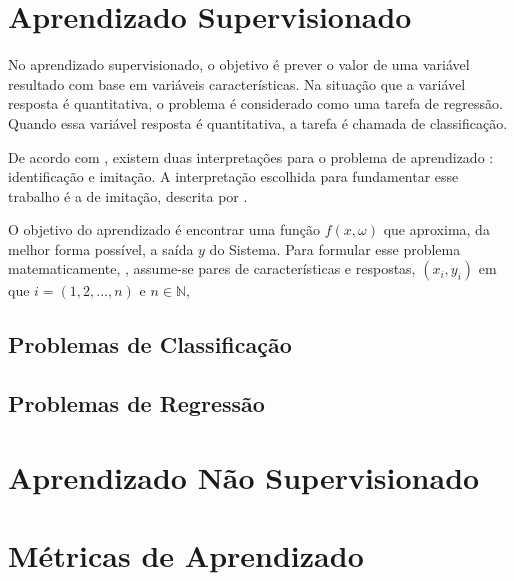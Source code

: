 \section{Aprendizado Supervisionado}

No aprendizado supervisionado, o objetivo é prever o valor de uma variável resultado com base em variáveis características. Na situação que a variável resposta é quantitativa, o problema é considerado como uma tarefa de regressão. Quando essa variável resposta é quantitativa, a tarefa é chamada de classificação.

De acordo com , existem duas interpretações para o problema de aprendizado : identificação e imitação. A interpretação escolhida para fundamentar esse trabalho é a de imitação, descrita por .

O objetivo do aprendizado é encontrar uma função $f(x, \omega)$ que aproxima, da melhor forma possível, a saída $y$ do Sistema. Para formular esse problema matematicamente, , assume-se pares de características e respostas, $(x_i, y_i)$ em que $i = (1, 2, ..., n)$ e $ n \in \mathbb {N}$, 



\subsection{Problemas de Classificação}
\subsection{Problemas de Regressão}

\section{Aprendizado Não Supervisionado}

\section{Métricas de Aprendizado}
